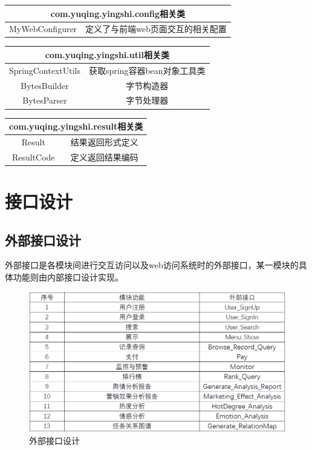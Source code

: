 \begin{tabular}{|c|c|} 
\hline 
\multicolumn{2}{|c|}{com.yuqing.yingshi.config相关类} \\ 
\hline 
MyWebConfigurer& 定义了与前端web页面交互的相关配置\\
\hline 
\end{tabular}

\begin{tabular}{|c|c|} 
\hline 
\multicolumn{2}{|c|}{com.yuqing.yingshi.util相关类} \\ 
\hline 
SpringContextUtils&获取spring容器bean对象工具类\\
BytesBuilder&字节构造器\\
BytesParser&字节处理器\\
\hline 
\end{tabular}

\begin{tabular}{|c|c|} 
\hline 
\multicolumn{2}{|c|}{com.yuqing.yingshi.result相关类} \\ 
\hline 
Result&结果返回形式定义\\
ResultCode&定义返回结果编码\\
\hline 
\end{tabular}
\section{接口设计}
\subsection{外部接口设计}
外部接口是各模块间进行交互访问以及web访问系统时的外部接口，某一模块的具体功能则由内部接口设计实现。
\begin{figure}[!htbp]
	\centering
	\includegraphics[scale=0.4]{image/m1.png}
	\caption{外部接口设计}
\end{figure}
